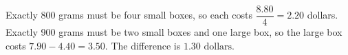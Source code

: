 Exactly 800 grams must be four small boxes, so each costs $\dfrac{8.80}{4}=2.20$ dollars. Exactly 900 grams must be two small boxes and one large box, so the large box costs $7.90-4.40=3.50$. The difference is $\boxed{1.30\text{ dollars}}$.
